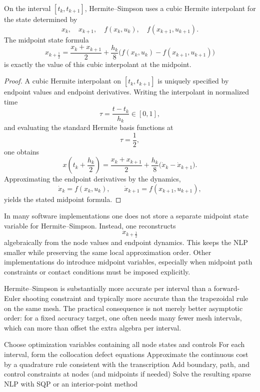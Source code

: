 \begin{proposition}\label{prop:l5-hermite-simpson-midpoint-construction}
	On the interval $[t_k,t_{k+1}]$, Hermite--Simpson uses a cubic Hermite interpolant for the state determined by
	\[
		x_k,\quad x_{k+1},\quad f(x_k,u_k),\quad f(x_{k+1},u_{k+1}).
	\]
	The midpoint state formula
	\[
		x_{k+\frac{1}{2}}
		=
		\frac{x_k+x_{k+1}}{2}
		+
		\frac{h_k}{8}\bigl(f(x_k,u_k)-f(x_{k+1},u_{k+1})\bigr)
	\]
	is exactly the value of this cubic interpolant at the midpoint.
\end{proposition}
\begin{proof}
	A cubic Hermite interpolant on $[t_k,t_{k+1}]$ is uniquely specified by endpoint values and endpoint derivatives. Writing the interpolant in normalized time
	\[
		\tau=\frac{t-t_k}{h_k} \in [0,1],
	\]
	and evaluating the standard Hermite basis functions at
	\[
		\tau=\frac{1}{2},
	\]
	one obtains
	\[
		x\!\left(t_k+\frac{h_k}{2}\right)
		=
		\frac{x_k+x_{k+1}}{2}
		+
		\frac{h_k}{8}\bigl(\dot x_k-\dot x_{k+1}\bigr).
	\]
	Approximating the endpoint derivatives by the dynamics,
	\[
		\dot x_k=f(x_k,u_k),
		\qquad
		\dot x_{k+1}=f(x_{k+1},u_{k+1}),
	\]
	yields the stated midpoint formula.
\end{proof}

\begin{remark}
	In many software implementations one does not store a separate midpoint state variable for Hermite--Simpson. Instead, one reconstructs
	\[
		x_{k+\frac{1}{2}}
	\]
	algebraically from the node values and endpoint dynamics. This keeps the NLP smaller while preserving the same local approximation order. Other implementations do introduce midpoint variables, especially when midpoint path constraints or contact conditions must be imposed explicitly.
\end{remark}

\begin{remark}
	Hermite--Simpson is substantially more accurate per interval than a forward-Euler shooting constraint and typically more accurate than the trapezoidal rule on the same mesh. The practical consequence is not merely better asymptotic order: for a fixed accuracy target, one often needs many fewer mesh intervals, which can more than offset the extra algebra per interval.
\end{remark}

\begin{algorithm}[H]
	\DontPrintSemicolon
	\caption{Direct Collocation Transcription}
\label{alg:l5-direct-collocation-transcription}
	Choose optimization variables containing all node states and controls\;
	For each interval, form the collocation defect equations\;
	Approximate the continuous cost by a quadrature rule consistent with the transcription\;
	Add boundary, path, and control constraints at nodes (and midpoints if needed)\;
	Solve the resulting sparse NLP with SQP or an interior-point method\;
\end{algorithm}

